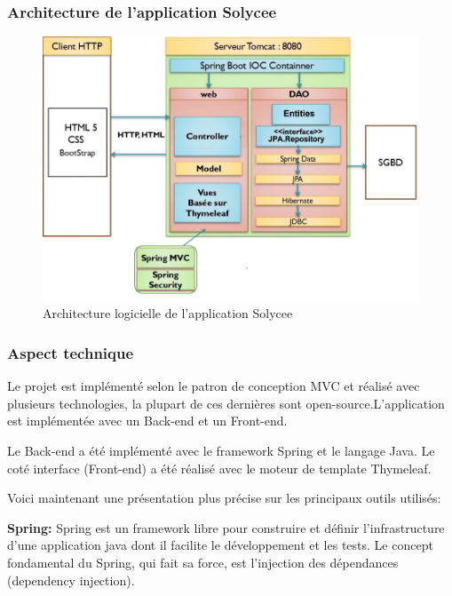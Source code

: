 \documentclass[12pt]{article}
\begin{document}
\subsubsection{Architecture de l'application Solycee}

\begin{figure}[H]
    \centering
    \includegraphics[width=0.9 \textwidth]{diagrammes/archiSolycee.png}
    \caption{Architecture logicielle de l'application Solycee }
\end{figure}

\subsubsection{Aspect technique}

Le projet est implémenté selon le patron de conception MVC et réalisé avec plusieurs technologies, la plupart de ces dernières sont open-source.L'application est implémentée avec un Back-end et un Front-end.

Le Back-end a été implémenté avec le framework Spring et le langage Java. Le coté interface (Front-end) a été réalisé avec le moteur de template Thymeleaf. 

Voici maintenant une présentation plus précise sur les principaux outils utilisés:\newline

\textbf{Spring:} Spring est un framework libre pour construire et définir l'infrastructure d'une application java dont il facilite le développement et les tests. Le concept fondamental du Spring, qui fait sa force, est l'injection des dépendances (dependency injection).\newline
\end{document}
